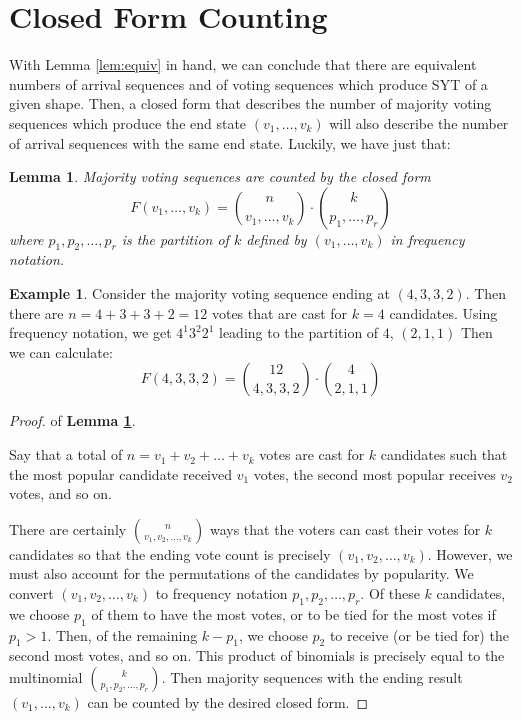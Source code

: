 \documentclass[article]{amsart}
\theoremstyle{plain}
\newtheorem{lemma}[proposition]{Lemma}
\theoremstyle{definition}
\newtheorem{example}{Example}
\begin{document}
\section{Closed Form Counting} \label{closed_form}

With Lemma \ref{lem:equiv} in hand, we can conclude that there are equivalent numbers of arrival sequences and of voting sequences which produce SYT of a given shape. Then, a closed form that describes the number of majority voting sequences which produce the end state $(v_1, \dots, v_k)$ will also describe the number of arrival sequences with the same end state. Luckily, we have just that:

\begin{lemma} \label{lem:maj_cf}
    Majority voting sequences are counted by the closed form
    \[ F(v_1, \dots, v_k) = \binom{n}{v_1, \dots, v_k} \cdot \binom{k}{p_1, \dots, p_r} \]
    where $p_1, p_2, \dots, p_r$ is the partition of $k$ defined by $(v_1, \dots, v_k)$ in frequency notation.
\end{lemma}

\begin{example}
  Consider the majority voting sequence ending at $(4,3,3,2)$. Then there are $n = 4 + 3 + 3 + 2 = 12$ votes that are cast for $k = 4$ candidates. Using frequency notation,
  we get $4^1 3^2 2^1$ leading to the partition of $4$, $(2,1,1)$
    Then we can calculate: 
    \[F(4,3,3,2) = \binom{12}{4,3,3,2} \cdot \binom{4}{2,1,1} \]
\end{example}

\begin{proof}
    of \textbf{Lemma \ref{lem:maj_cf}}.

    Say that a total of $n = v_1 + v_2 + \dots + v_k$ votes are cast for $k$ candidates such that the most popular candidate received $v_1$ votes, the second most popular receives $v_2$ votes, and so on. 
    
    There are certainly $\binom{n}{v_1, v_2, \dots, v_k}$ ways that the voters can cast their votes for $k$ candidates so that the ending vote count is precisely $(v_1, v_2, \dots, v_k)$. However, we must also account for the permutations of the candidates by popularity. We convert $(v_1, v_2, \dots, v_k)$ to frequency notation $p_1, p_2, \dots, p_r$. Of these $k$ candidates, we choose $p_1$ of them to have the most votes, or to be tied for the most votes if $p_1 > 1$. Then, of the remaining $k - p_1$, we choose $p_2$ to receive (or be tied for) the second most votes, and so on. This product of binomials is precisely equal to the multinomial $\binom{k}{p_1, p_2, \dots, p_r}$. Then majority sequences with the ending result $(v_1, \dots, v_k)$ can be counted by the desired closed form.
\end{proof}
\end{document}

